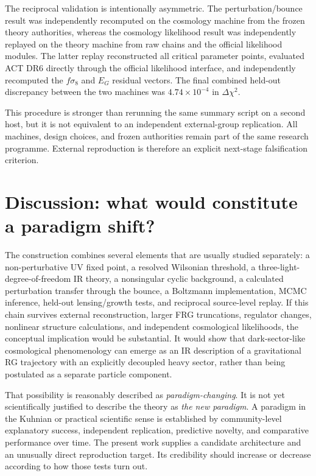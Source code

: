 \documentclass[12pt]{iopart}
\begin{document}
The reciprocal validation is intentionally asymmetric.  The perturbation/bounce result was independently recomputed on the cosmology machine from the frozen theory authorities, whereas the cosmology likelihood result was independently replayed on the theory machine from raw chains and the official likelihood modules.  The latter replay reconstructed all critical parameter points, evaluated ACT DR6 directly through the official likelihood interface, and independently recomputed the $f\sigma_8$ and $E_G$ residual vectors.  The final combined held-out discrepancy between the two machines was $4.74\times10^{-4}$ in $\Delta\chi^2$.

This procedure is stronger than rerunning the same summary script on a second host, but it is not equivalent to an independent external-group replication.  All machines, design choices, and frozen authorities remain part of the same research programme.  External reproduction is therefore an explicit next-stage falsification criterion.

\section{Discussion: what would constitute a paradigm shift?}
\label{sec:discussion}

The construction combines several elements that are usually studied separately: a non-perturbative UV fixed point, a resolved Wilsonian threshold, a three-light-degree-of-freedom IR theory, a nonsingular cyclic background, a calculated perturbation transfer through the bounce, a Boltzmann implementation, MCMC inference, held-out lensing/growth tests, and reciprocal source-level replay.  If this chain survives external reconstruction, larger FRG truncations, regulator changes, nonlinear structure calculations, and independent cosmological likelihoods, the conceptual implication would be substantial.  It would show that dark-sector-like cosmological phenomenology can emerge as an IR description of a gravitational RG trajectory with an explicitly decoupled heavy sector, rather than being postulated as a separate particle component.

That possibility is reasonably described as \emph{paradigm-changing}.  It is not yet scientifically justified to describe the theory as \emph{the new paradigm}.  A paradigm in the Kuhnian or practical scientific sense is established by community-level explanatory success, independent replication, predictive novelty, and comparative performance over time.  The present work supplies a candidate architecture and an unusually direct reproduction target.  Its credibility should increase or decrease according to how those tests turn out.
\end{document}
